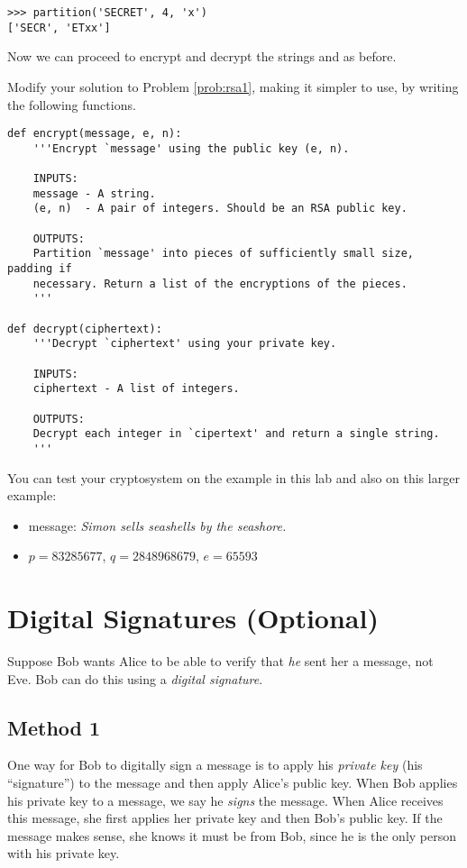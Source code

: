 \begin{lstlisting}
>>> partition('SECRET', 4, 'x')
['SECR', 'ETxx']
\end{lstlisting}
Now we can proceed to encrypt and decrypt the strings  and  as before.

\begin{problem}[Optional]
Modify your solution to Problem \ref{prob:rsa1}, making it simpler to use, by writing the following functions.
\begin{lstlisting}
def encrypt(message, e, n):
    '''Encrypt `message' using the public key (e, n).
    
    INPUTS:
    message - A string.
    (e, n)  - A pair of integers. Should be an RSA public key.
    
    OUTPUTS:
    Partition `message' into pieces of sufficiently small size, padding if 
    necessary. Return a list of the encryptions of the pieces.
    '''
    
def decrypt(ciphertext):
    '''Decrypt `ciphertext' using your private key.
    
    INPUTS:
    ciphertext - A list of integers.
    
    OUTPUTS:
    Decrypt each integer in `cipertext' and return a single string.
    '''
\end{lstlisting}

You can test your cryptosystem on the example in this lab and also on this larger example:
\begin{itemize}
\item message: \emph{Simon sells seashells by the seashore.}
\item $p=83285677$, $q=2848968679$, $e=65593$
\end{itemize}
\label{rsa2}
\end{problem}

\section*{Digital Signatures (Optional)}
Suppose Bob wants Alice to be able to verify that \emph{he} sent her a message, not Eve.
Bob can do this using a \emph{digital signature}.

\subsection*{Method 1}
One way for Bob to digitally sign a message is to apply his \emph{private key} (his ``signature'') to the message and then apply Alice's public key.
When Bob applies his private key to a message, we say he \emph{signs} the message.
When Alice receives this message, she first applies her private key and then Bob's public key. 
If the message makes sense, she knows it must be from Bob, since he is the only person with his private key.


